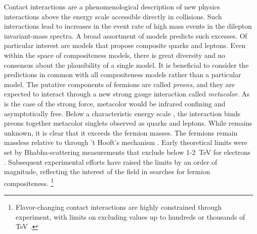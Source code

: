 Contact interactions are a phenomenological description of new physics interactions above the energy scale accessible directly in collisions.
Such interactions lead to increases in the event rate of high mass events in the dilepton invariant-mass spectra. 
A broad assortment of models predicts such excesses.
Of particular interest are models that propose composite quarks and leptons.
Even within the space of compositeness models, there is great diversity and no consensus about the plausibility of a single model. 
It is beneficial to consider the predictions in common with all compositeness models rather than a particular model.
The putative components of fermions are called \emph{preons}, and they are expected to interact through a new strong gauge interaction called \emph{metacolor}.
As is the case of the strong force, metacolor would be infrared confining and asymptotically free.
Below a characteristic energy scale \lam, the interaction binds preons together metacolor singlets observed as quarks and leptons.
While \lam remains unknown, it is clear that it exceeds the fermion masses.
The fermions remain massless relative to \lam through 't Hooft's mechanism \cite{Eichten:1984eu}.
Early theoretical limits were set by Bhabha-scattering measurements that exclude \lam below 1-2~TeV for electrons \cite{Eichten:1984eu}.
Subsequent experimental efforts have raised the limits by an order of magnitude, reflecting the interest of the field in searches for fermion compositeness.
\footnote{Flavor-changing contact interactions are highly constrained through experiment, with limits on \lam excluding values up to hundreds or thousands of TeV \cite{Eichten:1984eu}.}

